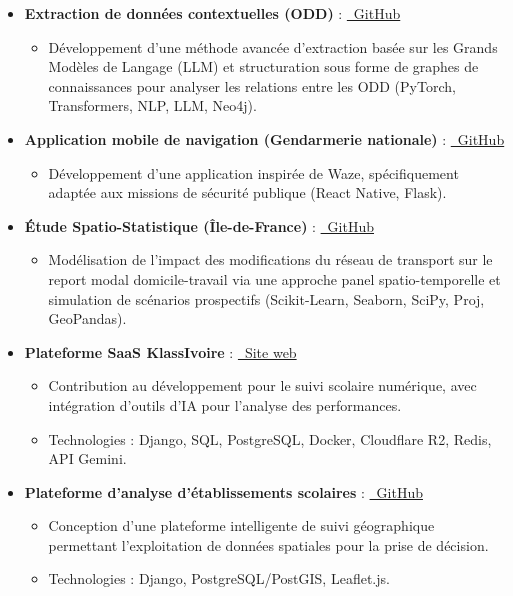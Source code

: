 \documentclass[11pt, a4paper]{article}
\begin{document}
\begin{itemize}[leftmargin=0.5cm, nosep]
    \item \textbf{Extraction de données contextuelles (ODD)} : \href{https://github.com/MarcelAssie/PIR18}{\faGithub~GitHub}
    \begin{itemize}[leftmargin=0.5cm, nosep]
        \item Développement d'une méthode avancée d'extraction basée sur les Grands Modèles de Langage (LLM) et structuration sous forme de graphes de connaissances pour analyser les relations entre les ODD (PyTorch, Transformers, NLP, LLM, Neo4j).
    \end{itemize}
    \vspace{0.2cm}
    \item \textbf{Application mobile de navigation (Gendarmerie nationale)} : \href{https://github.com/WYBG/PDI-APP-Nav-WAZE}{\faGithub~GitHub}
    \begin{itemize}[leftmargin=0.5cm, nosep]
        \item Développement d'une application inspirée de Waze, spécifiquement adaptée aux missions de sécurité publique (React Native, Flask).
    \end{itemize}
    \vspace{0.2cm}
    \item \textbf{Étude Spatio-Statistique (Île-de-France)} : \href{https://github.com/MarcelAssie/SpatialAnalysisProject}{\faGithub~GitHub}
    \begin{itemize}[leftmargin=0.5cm, nosep]
        \item Modélisation de l'impact des modifications du réseau de transport sur le report modal domicile-travail via une approche panel spatio-temporelle et simulation de scénarios prospectifs (Scikit-Learn, Seaborn, SciPy, Proj, GeoPandas).
    \end{itemize}
    \vspace{0.2cm}
    \item \textbf{Plateforme SaaS KlassIvoire} : \href{https://klassivoire.kaedys.com/}{\faGlobe~Site web}
    \begin{itemize}[leftmargin=0.5cm, nosep]
        \item Contribution au développement pour le suivi scolaire numérique, avec intégration d’outils d'IA pour l'analyse des performances.
        \item Technologies : Django, SQL, PostgreSQL, Docker, Cloudflare R2, Redis, API Gemini.
    \end{itemize}
    \vspace{0.2cm}
    \item \textbf{Plateforme d'analyse d'établissements scolaires} : \href{https://github.com/MarcelAssie/SIGWEB}{\faGithub~GitHub}
    \begin{itemize}[leftmargin=0.5cm, nosep]
        \item Conception d’une plateforme intelligente de suivi géographique permettant l’exploitation de données spatiales pour la prise de décision.
        \item Technologies : Django, PostgreSQL/PostGIS, Leaflet.js.
    \end{itemize}
\end{itemize}
\end{document}
